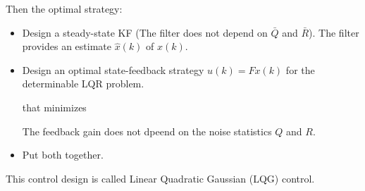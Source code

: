 \documentclass[10pt,a4paper]{scrartcl}
\begin{document}
\begin{multicols*}{2}
Then the optimal strategy:

\begin{itemize}
\item Design a steady-state KF (The filter does not depend on $\bar{Q}$ and $\bar{R}$). The filter provides an estimate $\hat{x}(k)$ of $x(k)$.
\item Design an optimal state-feedback strategy $u(k)=Fx(k)$ for the determinable LQR problem.


that minimizes


The feedback gain does not dpeend on the noise statistics $Q$ and $R$.
\item Put both together.
\end{itemize}

This control design is called Linear Quadratic Gaussian (LQG) control. 

\end{multicols*}
\end{document}
